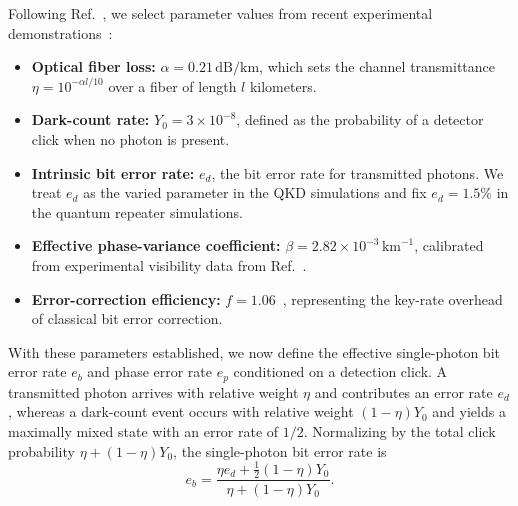 \documentclass[onecolumn,prx,longbibliography,nofootinbib, superscriptaddress]{revtex4-2}
\theoremstyle{recap}
\begin{document}
Following Ref.~\cite{AQT}, we select parameter values from recent experimental demonstrations~\cite{Ma18PM,Zhu24,Liu2026}:
\begin{itemize}
    \item \textbf{Optical fiber loss:} $\alpha = 0.21\,\mathrm{dB/km}$, which sets the channel transmittance $\eta = 10^{-\alpha l/10}$ over a fiber of length $l$ kilometers.
    \item \textbf{Dark-count rate:} $Y_0 = 3 \times 10^{-8}$, defined as the probability of a detector click when no photon is present.
    \item \textbf{Intrinsic bit error rate:} $e_d$, the bit error rate for transmitted photons. We treat $e_d$ as the varied parameter in the QKD simulations and fix $e_d = 1.5\%$ in the quantum repeater simulations.
    \item \textbf{Effective phase-variance coefficient:} $\beta = 2.82 \times 10^{-3}\,\mathrm{km}^{-1}$, calibrated from experimental visibility data from Ref.~\cite{Liu2026}.
    \item \textbf{Error-correction efficiency:} $f = 1.06$~\cite{Zhu24}, representing the key-rate overhead of classical bit error correction.
\end{itemize} 

With these parameters established, we now define the effective single-photon bit error rate $e_b$ and phase error rate $e_p$ conditioned on a detection click. A transmitted photon arrives with relative weight $\eta$ and contributes an error rate $e_d$, whereas a dark-count event occurs with relative weight $(1-\eta)Y_0$ and yields a maximally mixed state with an error rate of $1/2$. Normalizing by the total click probability $\eta + (1-\eta)Y_0$, the single-photon bit error rate is
\begin{equation}
    e_b = \frac{\eta e_d + \frac{1}{2}(1-\eta)Y_0}{\eta + (1-\eta)Y_0}.
\end{equation}
\end{document}
